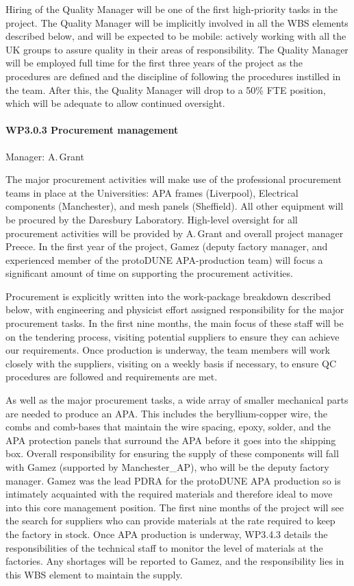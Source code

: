 Hiring of the Quality Manager will be one of the first high-priority tasks in the project.
The Quality Manager will be implicitly involved in all the WBS elements described below, and will be expected to be mobile: actively working with all the UK groups to assure quality in their areas of responsibility. The Quality Manager will be employed full time for the first three years of the project as the procedures are defined and the discipline of following the procedures instilled in the team. After this, the Quality Manager will drop to a 50\% FTE position, which will be adequate to allow continued oversight.

\paragraph{WP3.0.3 Procurement management}

Manager: A.\,Grant

The major procurement activities will make use of the professional procurement teams in place at the Universities: APA frames (Liverpool), Electrical components (Manchester), and mesh panels (Sheffield). All other equipment will be procured by the Daresbury Laboratory. High-level oversight for all procurement activities will be provided by A.\,Grant and overall project manager Preece. In the first year of the project, Gamez (deputy factory manager, and experienced member of the protoDUNE APA-production team) will focus a significant amount of time on supporting the procurement activities.

Procurement is explicitly written into the work-package breakdown described below, with engineering and physicist effort assigned responsibility for the major procurement tasks. In the first nine months, the main focus of these staff will be on the tendering process, visiting potential suppliers to ensure they can achieve our requirements. Once production is underway, the team members will work closely with the suppliers, visiting on a weekly basis if necessary, to ensure QC procedures are followed and requirements are met.

As well as the major procurement tasks, a wide array of smaller mechanical parts are needed to produce an APA. This includes the beryllium-copper wire, the combs and comb-bases that maintain the wire spacing, epoxy, solder, and the APA protection panels that surround the APA before it goes into the shipping box. Overall responsibility for ensuring the supply of these components will fall with Gamez (supported by Manchester\_AP), who will be the deputy factory manager. Gamez was the lead PDRA for the protoDUNE APA production so is intimately acquainted with the required materials and therefore ideal to move into this core management position.
The first nine months of the project will see the search for suppliers who can provide materials at the rate required to keep the factory in stock. Once APA production is underway, WP3.4.3 details the responsibilities of the technical staff to monitor the level of materials at the factories. Any shortages will be reported to Gamez, and the responsibility lies in this WBS element to maintain the supply.

